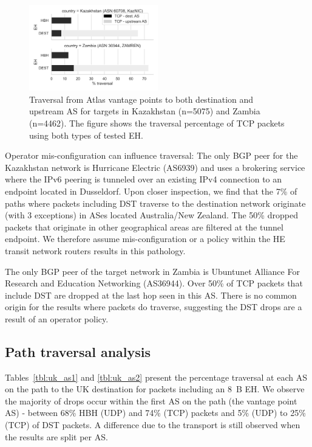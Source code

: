 \documentclass[conference]{IEEEtran}
\begin{document}
\begin{figure}
\centering
  \includegraphics[width=0.5\textwidth]{traversal-pathologies.png}
  \caption{Traversal from Atlas vantage points to both destination and upstream AS for targets in Kazakhstan (n=5075) and Zambia (n=4462). The figure shows the traversal percentage of TCP packets using both types of tested EH.}
  \label{fig:traversal_pathologies}
\end{figure}

Operator mis-configuration can influence traversal: The only BGP peer for the Kazakhstan network is Hurricane Electric (AS6939) and uses a  brokering service where the IPv6 peering is tunneled over an existing IPv4 connection to an endpoint located in Dusseldorf. Upon closer inspection, we find that the 7\% of paths where packets including DST traverse to the destination network originate (with 3 exceptions) in ASes located Australia/New Zealand. The 50\% dropped packets that originate in other geographical areas are filtered at the tunnel endpoint. We therefore assume mis-configuration or a policy within the HE transit network routers results in this pathology. 


The only BGP peer of the target network in Zambia is Ubuntunet Alliance For Research and Education Networking (AS36944). Over 50\% of TCP packets that include DST are dropped at the last hop seen in this AS. There is no common origin for the results where packets do traverse, suggesting the DST drops are a result of an operator policy. 

\subsection{Path traversal analysis}

Tables~\ref{tbl:uk_as1} and \ref{tbl:uk_as2} present the percentage traversal at each AS on the path to the UK destination for packets including an 8~B EH. We observe the majority of drops occur within the first AS on the path (the vantage point AS) - between 68\% HBH (UDP) and 74\% (TCP) packets and 5\% (UDP) to 25\% (TCP) of DST packets. A difference due to the transport is still observed when the results are split per AS. 
\end{document}
